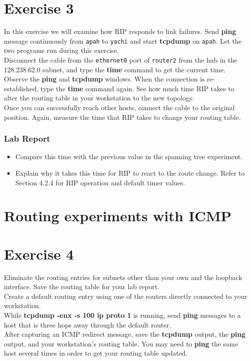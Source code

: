 \documentclass[10pt,a4paper]{article}
\numberwithin{equation}{section}
\numberwithin{figure}{section}
\numberwithin{table}{section}
\begin{document}
    \section{Exercise 3}
    In this exercise we will examine how RIP responds to link failures.
    Send \textbf{ping} message continuously from \texttt{apah} to \texttt{yachi} and start \textbf{tcpdump} on \texttt{apah}.
    Let the two programs run during this exercise. \\
    Disconnect the cable from the \texttt{ethernet0} port of \texttt{router2} from the hub in the 128.238.62.0 subnet, and type the \textbf{time} command to get the current time. \\
    Observe the \textbf{ping} and \textbf{tcpdump} windows.
    When the connection is re-established, type the \textbf{time}  command again.
    See how much time RIP takes to alter the routing table in your workstation to the new topology. \\
    Once you can successfully reach other hosts, connect the cable to the original position.
    Again, measure the time that RIP takes to change your routing table.
    \subsubsection*{Lab Report}
    \begin{itemize}
        \setlength{\itemindent}{0pt}
        \item Compare this time with the previous value in the spanning tree experiment.
        \item Explain why it takes this time for RIP to react to the route change.
        Refer to Section 4.2.4 for RIP operation and default timer values.
    \end{itemize}


    \section*{Routing experiments with ICMP}
    \section{Exercise 4}
    Eliminate the routing entries for subnets other than your own and the loopback interface.
    Save the routing table for your lab report. \\
    Create a default routing entry using one of the routers directly connected to your workstation. \\
    While \textbf{tcpdump -enx -s 100 ip proto 1} is running, send \textbf{ping} messages to a host that is three hops away through the default router. \\
    After capturing an ICMP redirect message, save the \textbf{tcpdump} output, the \textbf{ping} output, and your workstation’s routing table.
    You may need to \textbf{ping} the same host several times in order to get your routing table updated.
\end{document}
